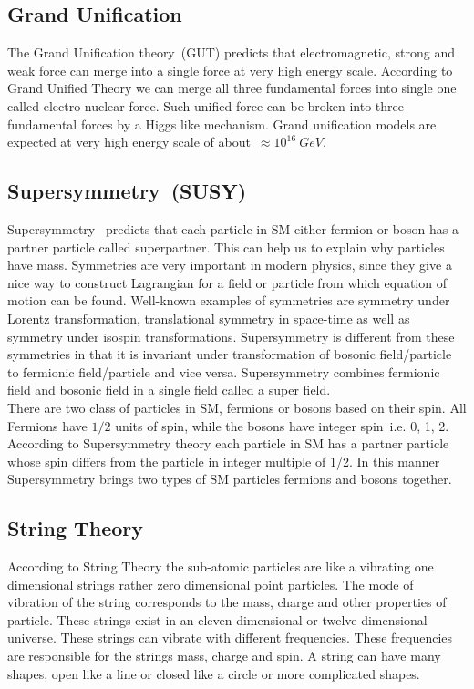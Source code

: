 \subsection{Grand Unification}
The Grand Unification theory~(GUT) predicts that electromagnetic, strong and weak force can merge into a single force at very high energy scale. According to Grand Unified Theory we can merge all three fundamental forces into single one called electro nuclear force. Such unified force can be broken into three fundamental forces by a Higgs like mechanism.  Grand unification models are expected at very high energy scale of about~$\approx 10^{16}~{GeV}$.
\subsection{Supersymmetry~(SUSY)}
Supersymmetry~\cite{article} predicts that each particle in SM either fermion or boson has a partner particle called superpartner. This can help us to explain why particles have mass. Symmetries are very important in modern physics, since they give a nice way to construct Lagrangian for a field or particle from which equation of motion can be found. Well-known examples of symmetries are symmetry under Lorentz transformation, translational symmetry in space-time as well as symmetry under isospin transformations. Supersymmetry is different from these symmetries in that it is invariant under transformation of bosonic field/particle to fermionic field/particle and vice versa. Supersymmetry combines fermionic field and bosonic field in a single field called a super field.\\
There are two class of particles in SM, fermions or bosons based on their spin. All Fermions have $1/2$ units of spin, while the bosons have integer spin~i.e. 0, 1, 2. According to Supersymmetry theory each particle in SM has a partner particle whose spin differs from the particle in integer multiple of 1/2. In this manner Supersymmetry brings two types of SM particles fermions and bosons together.
\subsection{String Theory}
According to String Theory the sub-atomic particles are like a vibrating one dimensional strings rather zero dimensional point particles. The mode of vibration of the string corresponds to the mass, charge and other properties of particle. These strings exist in an eleven dimensional or twelve dimensional universe. These strings can vibrate with different frequencies. These frequencies are responsible for the strings mass, charge and spin. A string can have many shapes, open like a line or closed like a circle or more complicated shapes.

